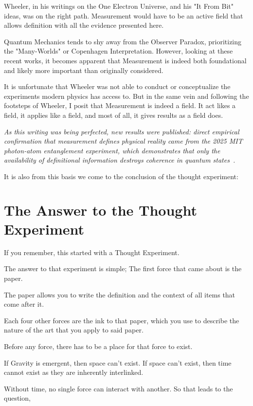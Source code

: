 Wheeler, in his writings on the One Electron Universe, and his "It From Bit" ideas, was on the right path. Measurement would have to be an active field that allows definition with all the evidence presented here. 

Quantum Mechanics tends to shy away from the Observer Paradox, prioritizing the "Many-Worlds" or Copenhagen Interpretation. However, looking at these recent works, it becomes apparent that Measurement is indeed both foundational and likely more important than originally considered.

It is unfortunate that Wheeler was not able to conduct or conceptualize the experiments modern physics has access to. But in the same vein and following the footsteps of Wheeler, I posit that Measurement is indeed a field. It act likes a field, it applies like a field, and most of all, it gives results as a field does. 

\textit{As this writing was being perfected, new results were published: direct empirical confirmation that measurement defines physical reality came from the 2025 MIT photon-atom entanglement experiment, which demonstrates that only the \emph{availability} of definitional information destroys coherence in quantum states~\cite{MIT2025DoubleSlit}.}

It is also from this basis we come to the conclusion of the thought experiment:

\section{The Answer to the Thought Experiment}

If you remember, this started with a Thought Experiment. 

The answer to that experiment is simple; The first force that came about is the paper. 

The paper allows you to write the definition and the context of all items that come after it. 

Each four other forces are the ink to that paper, which you use to describe the nature of the art that you apply to said paper. 

Before any force, there has to be a place for that force to exist. 

If Gravity is emergent, then space can't exist. If space can't exist, then time cannot exist as they are inherently interlinked. 

Without time, no single force can interact with another. So that leads to the question,

